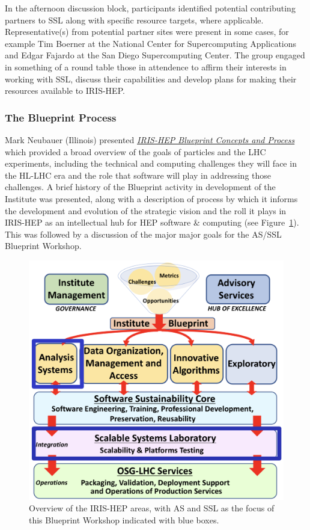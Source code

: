 \documentclass[11pt,letterpaper,fleqn]{article}
\begin{document}
In the afternoon discussion block, participants identified potential contributing partners to SSL along with specific resource targets, where applicable. Representative(s) from potential partner sites were present in some cases, for example Tim Boerner at the National Center for Supercomputing Applications and Edgar Fajardo at the San Diego Supercomputing Center. The group engaged in something of a round table those in attendence to affirm their interests in working with SSL, discuss their capabilities and develop plans for making their resources available to IRIS-HEP.

\subsubsection{The Blueprint Process}
\vspace{0.2cm}
Mark Neubauer (Illinois) presented \href{https://indico.cern.ch/event/820946/contributions/3461588/attachments/1866577/3069573/IRIS-HEP_BluePrint_AS_SSL.pdf}{\it IRIS-HEP Blueprint Concepts and Process} which provided a broad overview of the goals of particles and the LHC experiments, including the technical and computing challenges they will face in the HL-LHC era and the role that software will play in addressing those challenges. A brief history of the Blueprint activity in development of the Institute was presented, along with a description of process by which it informs the development and evolution of the strategic vision and the roll it plays in IRIS-HEP as an intellectual hub for HEP software \& computing (see Figure~\ref{fig:overview}). This was followed by a discussion of the major major goals for the AS/SSL Blueprint Workshop. \begin{figure}
  \centering
  \vspace{-0.4cm}
  \includegraphics[width=0.99\linewidth]{figures/AS_SSL_IRIS-HEP.png}
  \vspace{-0.7cm}
  \caption{Overview of the IRIS-HEP areas, with AS and SSL as the focus of this Blueprint Workshop indicated with blue boxes.}
  \label{fig:overview}
\end{figure}
\end{document}
